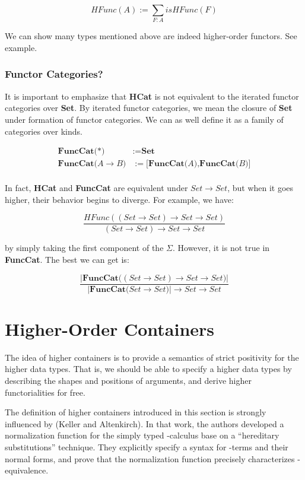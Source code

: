 \[ HFunc(A) := \sum_{F : A} isHFunc(F) \]

We can show many types mentioned above are indeed higher-order functors. See example.

\subsubsection*{Functor Categories?}

It is important to emphasize that \textbf{HCat} is not equivalent to the iterated functor categories over \textbf{Set}. By iterated functor categories, we mean the closure of \textbf{Set} under formation of functor categories. We can as well define it as a family of categories over kinds.

\begin{align*}
\textbf{FuncCat(} *\textbf{)} & := \textbf{Set} \\
\textbf{FuncCat(} A \to B \textbf{)} & := \textbf{[FuncCat(} A \textbf{),FuncCat(} B \textbf{)]} \\
\end{align*}

In fact, \textbf{HCat} and \textbf{FuncCat} are equivalent under $Set \to Set$, but when it goes higher, their behavior begins to diverge. For example, we have:

\[ \frac{HFunc((Set \to Set) \to Set \to Set)}{(Set \to Set) \to Set \to Set} \]

by simply taking the first component of the $\Sigma$. However, it is not true in \textbf{FuncCat}. The best we can get is:

\[ \frac{\lvert\textbf{FuncCat(} (Set \to Set) \to Set \to Set \textbf{)}\rvert}
  {\lvert\textbf{FuncCat(} Set \to Set \textbf{)}\rvert \to Set \to Set}
\]

\section{Higher-Order Containers}

The idea of higher containers is to provide a semantics of strict positivity for the higher data types. That is, we should be able to specify a higher data types by describing the shapes and positions of arguments, and derive higher functorialities for free. 

The definition of higher containers introduced in this section is strongly influenced by (Keller and Altenkirch)\cite{keller2010normalization}. In that work, the authors developed a normalization function for the simply typed \lambda-calculus base on a ``hereditary substitutions'' technique. They explicitly specify a syntax for \lambda-terms and their normal forms, and prove that the normalization function precisely characterizes \beta\eta-equivalence.


